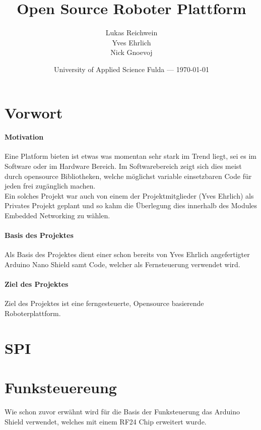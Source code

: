 \documentclass{article}
\title{Open Source Roboter Plattform} %
\author{Lukas Reichwein\\ Yves Ehrlich\\ Nick Gnoevoj}
\date{University of Applied Science Fulda --- \today} %
\begin{document}
\maketitle %
\tableofcontents %
\newpage


\section{Vorwort} %
    \paragraph{Motivation}
    Eine Platform bieten ist etwas was momentan sehr stark im Trend liegt, sei es im Software oder im Hardware Bereich. Im Softwarebereich zeigt sich dies meist durch opensource Bibliotheken, welche möglichst variable einsetzbaren Code für jeden frei zugänglich machen. \\    
    Ein solches Projekt war auch von einem der Projektmitglieder (Yves Ehrlich) als Privates Projekt geplant und so kahm die Überlegung dies innerhalb des Modules Embedded Networking zu wählen.\linebreak
    \paragraph{Basis des Projektes}
    Als Basis des Projektes dient einer schon bereits von Yves Ehrlich angefertigter Arduino Nano Shield samt Code,
    \cite{nanoGame} welcher als Fernsteuerung verwendet wird. 
    \paragraph{Ziel des Projektes}	
	Ziel des Projektes ist eine ferngesteuerte, Opensource basierende Roboterplattform.

\newpage    
\section{SPI}%

\newpage
\section{Funksteuereung} %
    Wie schon zuvor erwähnt wird für die Basis der Funksteuerung das Arduino Shield verwendet, welches mit einem RF24 Chip erweitert wurde.
\end{document}
